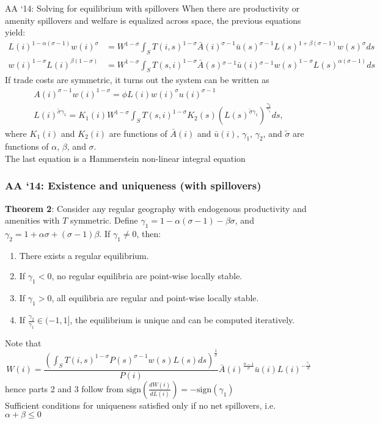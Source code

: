 \documentclass[11pt,notes=hide,aspectratio=169]{beamer}
\begin{document}
\begin{frame}{AA `14: Solving for equilibrium with spillovers}
When there are productivity or amenity spillovers and welfare is equalized across space, the previous equations yield:
\begin{align*}
L(i)^{1-\alpha(\sigma-1)}w(i)^{\sigma}&=W^{1-\sigma}\int_{S}T(i,s)^{1-\sigma}\bar{A}(i)^{\sigma-1}\bar{u}(s)^{\sigma-1}L(s)^{1+\beta(\sigma-1)}w(s)^{\sigma}ds \\ 
w(i)^{1-\sigma}L(i)^{\beta(1-\sigma)}&=W^{1-\sigma}\int_{S}T(s,i)^{1-\sigma}\bar{A}(s){}^{\sigma-1}\bar{u}(i){}^{\sigma-1}w(s)^{1-\sigma}L(s)^{\alpha(\sigma-1)}ds
\end{align*}
If trade costs are symmetric, it turns out the system can be written as
\begin{align}
A(i)^{\sigma-1}w(i)^{1-\sigma} =\phi L(i)w(i)^{\sigma}u(i)^{\sigma-1} \label{eq:bla} \\
L(i)^{\tilde{\sigma}\gamma_{1}} =K_{1}(i)W^{1-\sigma}\int_{S}T\left(s,i\right)^{1-\sigma}K_{2}(s)\left(L(s)^{\tilde{\sigma}\gamma_{1}}\right)^{\frac{\gamma_{2}}{\gamma_{1}}}ds, 
\end{align}
where $K_{1}(i)$  and $K_{2}(i)$ are functions of $\bar{A}(i)$ and $\bar{u}(i)$, $\gamma_{1}$, $\gamma_{2}$, and $\tilde{\sigma}$ are functions of $\alpha$, $\beta$, and $\sigma$. 
\\
The last equation is a Hammerstein non-linear integral equation 
\end{frame}
\begin{frame}
\frametitle{AA `14: Existence and uniqueness (with spillovers)}
\textbf{Theorem 2}: Consider any regular geography with endogenous productivity and amenities with $T$ symmetric. Define $\gamma_{1} = 1-\alpha\left(\sigma-1\right)-\beta\sigma$, and $\gamma_{2} = 1+\alpha\sigma+\left(\sigma-1\right)\beta$. If $\gamma_{1}\neq0$, then:
\begin{enumerate}
\item There exists a regular equilibrium. 
\item If $\gamma_{1}<0$, no regular equilibria are point-wise locally stable.
\item If $\gamma_{1}>0$, all equilibria are regular and point-wise locally stable.\medskip
\item If $\frac{\gamma_{2}}{\gamma_{1}}\in(-1,1]$, the equilibrium is unique and can be computed iteratively. 
\end{enumerate}
Note that
\begin{equation*}
W(i) = \frac{\left( \int_{S} T(i,s)^{1-\sigma}P(s)^{\sigma-1} w(s) L(s) ds  \right)^{\frac{1}{\sigma}}}{P(i)} \bar{A}(i)^{\frac{\sigma-1}{\sigma}}\bar{u}(i)L(i)^{-\frac{\gamma_{1}}{\sigma}}
\end{equation*}
hence parts 2 and 3 follow from $\text{sign}\left(\frac{dW(i)}{dL(i)}\right)=-\text{sign}(\gamma_1)$
\\ 
Sufficient conditions for uniqueness satisfied only if no net spillovers, i.e. $\alpha + \beta \leq 0$
\end{frame}
\end{document}
